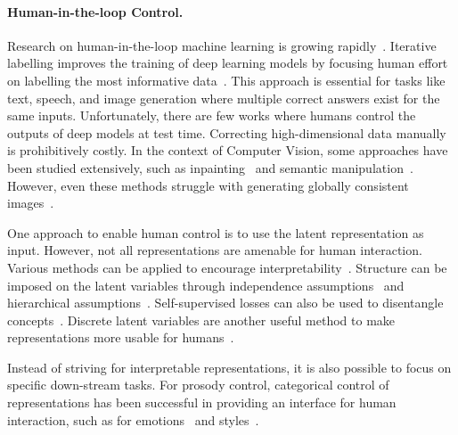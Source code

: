 \documentclass[a4paper,12pt,twoside,openright]{article}
\begin{document}
\paragraph{Human-in-the-loop Control.} Research on human-in-the-loop machine learning is growing rapidly~\parencite{wu2022survey}. Iterative labelling improves the training of deep learning models by focusing human effort on labelling the most informative data~\parencite{xin2018accelerating,chai2020human}. This approach is essential for tasks like text, speech, and image generation where multiple correct answers exist for the same inputs. Unfortunately, there are few works where humans control the outputs of deep models at test time. Correcting high-dimensional data manually is prohibitively costly. In the context of Computer Vision, some approaches have been studied extensively, such as inpainting~\parencite{Elharrouss2019ImageIA} and semantic manipulation~\parencite{park2019SPADE}. However, even these methods struggle with generating globally consistent images~\parencite{Zhang2023TowardsCI}.

One approach to enable human control is to use the latent representation as input. However, not all representations are amenable for human interaction. Various methods can be applied to encourage interpretability~\parencite{Tschannen2018RecentAI}. Structure can be imposed on the latent variables through independence assumptions~\parencite{prosody-control:VAE-MI:2021} and hierarchical assumptions~\parencite{Hsu2017UnsupervisedLO}. Self-supervised losses can also be used to disentangle concepts~\parencite{prosody-control:VAE-3dim:2020}. Discrete latent variables are another useful method to make representations more usable for humans~\parencite{VQ-VAE:2017}.

Instead of striving for interpretable representations, it is also possible to focus on specific down-stream tasks. For prosody control, categorical control of representations has been successful in providing an interface for human interaction, such as for emotions~\parencite{schroder:2001} and styles~\parencite{amazon-newscaster:2019}.
\end{document}
